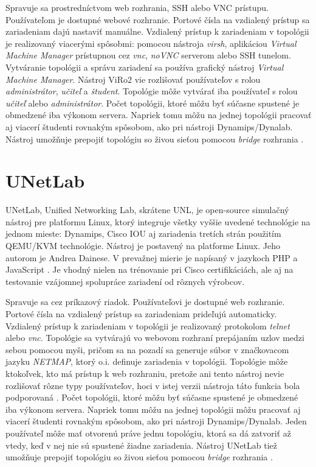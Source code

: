 Spravuje sa prostredníctvom web rozhrania, SSH alebo VNC prístupu. Používateľom je dostupné webové rozhranie. Portové čísla na vzdialený prístup sa zariadeniam dajú nastaviť manuálne. Vzdialený prístup k zariadeniam v topológii je realizovaný viacerými spôsobmi: pomocou nástroja \emph{virsh}, aplikáciou \emph{Virtual Machine Manager} prístupnou cez \emph{vnc}, \emph{noVNC} serverom alebo SSH tunelom. Vytváranie topológii a správu zariadení sa používa grafický nástroj \emph{Virtual Machine Manager}. Nástroj ViRo2 vie rozlišovať používateľov s rolou \emph{administrátor}, \emph{učiteľ} a \emph{študent}. Topológie môže vytvárať iba používateľ s rolou \emph{učiteľ} alebo \emph{administrátor}. Počet topológii, ktoré môžu byť súčasne spustené je obmedzené iba výkonom servera. Napriek tomu môžu na jednej topológii pracovať aj viacerí študenti rovnakým spôsobom, ako pri nástroji Dynamips/Dynalab. Nástroj umožňuje prepojiť topológiu so živou sieťou pomocou \emph{bridge} rozhrania \cite{viro_hadac}.





\section{UNetLab}

UNetLab, Unified Networking Lab, skrátene UNL, je open-source  simulačný nástroj pre platformu Linux, ktorý integruje všetky vyššie uvedené technológie na jednom mieste: Dynamips, Cisco IOU aj zariadenia tretích strán použitím QEMU/KVM technológie. Nástroj je postavený na platforme Linux. Jeho autorom je Andrea Dainese. V prevažnej mierie je napísaný v jazykoch PHP a JavaScript \cite{webiou_unetlab_unetlabv2, unetlab_github}. Je vhodný nielen na trénovanie pri Cisco certifikáciách, ale aj na testovanie vzájomnej spolupráce zariadení od rôznych výrobcov.

Spravuje sa cez príkazový riadok. Používateľovi je dostupné web rozhranie. Portové čísla na vzdialený prístup sa zariadeniam prideľujú automaticky. Vzdialený prístup k zariadeniam v topológii je realizovaný protokolom \emph{telnet} alebo \emph{vnc}. Topológie sa vytvárajú vo webovom rozhraní prepájaním uzlov medzi sebou pomocou myši, pričom sa na pozadí sa generuje súbor v značkovacom jazyku \emph{NETMAP}, ktorý o.i. definuje zariadenia v topológii. Topológie môže ktokoľvek, kto má prístup k web rozhraniu, pretože ani tento nástroj nevie rozlišovať rôzne typy používateľov, hoci v istej verzii nástroja táto funkcia bola podporovaná \cite{unetlab_github}. Počet topológii, ktoré môžu byť súčasne spustené je obmedzené iba výkonom servera. Napriek tomu môžu na jednej topológii môžu pracovať aj viacerí študenti rovnakým spôsobom, ako pri nástroji Dynamips/Dynalab. Jeden používateľ môže mať otvorenú práve jednu topológiu, ktorá sa dá zatvoriť až vtedy, keď v nej nie sú spustené žiadne zariadenia. Nástroj UNetLab tiež umožňuje prepojiť topológiu so živou sieťou pomocou \emph{bridge} rozhrania \cite{webiou_real_network}.

